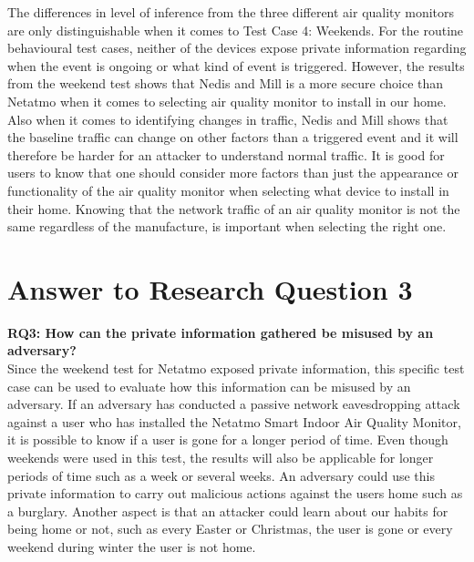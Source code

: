 The differences in level of inference from the three different air quality monitors are only distinguishable when it comes to Test Case 4: Weekends. For the routine behavioural test cases, neither of the devices expose private information regarding when the event is ongoing or what kind of event is triggered. However, the results from the weekend test shows that Nedis and Mill is a more secure choice than Netatmo when it comes to selecting air quality monitor to install in our home. Also when it comes to identifying changes in traffic, Nedis and Mill shows that the baseline traffic can change on other factors than a triggered event and it will therefore be harder for an attacker to understand normal traffic. It is good for users to know that one should consider more factors than just the appearance or functionality of the air quality monitor when selecting what device to install in their home. Knowing that the network traffic of an air quality monitor is not the same regardless of the manufacture, is important when selecting the right one. 

\section{Answer to Research Question 3}
\textbf{\gls{RQ}3: How can the private information gathered be misused by an adversary?}\\

Since the weekend test for Netatmo exposed private information, this specific test case can be used to evaluate how this information can be misused by an adversary. If an adversary has conducted a passive network eavesdropping attack against a user who has installed the Netatmo Smart Indoor Air Quality Monitor, it is possible to know if a user is gone for a longer period of time. Even though weekends were used in this test, the results will also be applicable for longer periods of time such as a week or several weeks. An adversary could use this private information to carry out malicious actions against the users home such as a burglary. Another aspect is that an attacker could learn about our habits for being home or not, such as every Easter or Christmas, the user is gone or every weekend during winter the user is not home. 

